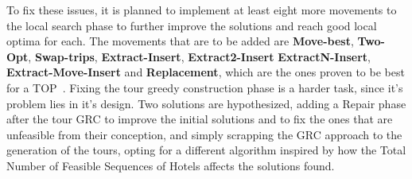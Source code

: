 To fix these issues, it is planned to implement at least eight more movements to the local search phase to further improve the solutions and reach good local optima for each. The movements that are to be added are \textbf{Move-best}, \textbf{Two-Opt}, \textbf{Swap-trips}, \textbf{Extract-Insert}, \textbf{Extract2-Insert} \textbf{ExtractN-Insert}, \textbf{Extract-Move-Insert} and \textbf{Replacement}, which are the ones proven to be best for a TOP~\cite{divsalar2013}. Fixing the tour greedy construction phase is a harder task, since it's problem lies in it's design. Two solutions are hypothesized, adding a Repair phase after the tour GRC to improve the initial solutions and to fix the ones that are unfeasible from their conception, and simply scrapping the GRC approach to the generation of the tours, opting for a different algorithm inspired by how the Total Number of Feasible Sequences of Hotels affects the solutions found.

